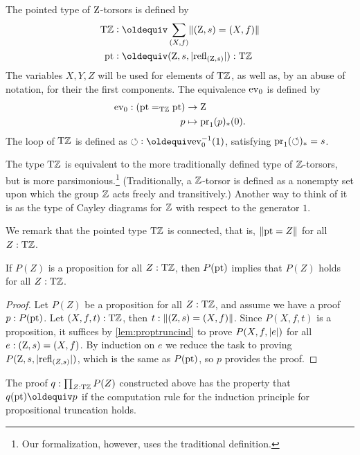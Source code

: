 \documentclass[a4paper,12pt]{amsart}
\begin{document}
\begin{definition}\label{def:TorZ}
  The pointed type of $\mathrm{Z}$-torsors is defined by
  \begin{align*}
    \TorZ &\defeq \sum_{(X,f)}\Trunc{(\zet,s)=(X,f)}  \\
    \pt & \defeq (\zet,s,\trunc{\refl{(\zet,s)}}) : \TorZ
  \end{align*}
  The variables $X,Y,Z$ will be used for elements of ${\mathrm{T}\mathbb{Z}}$,
  as well as, by an abuse of notation, for their the first components.
  The equivalence $\mathrm{ev}_0$ is defined by
  \begin{align*}
    \mathrm{ev}_0: ({\mathord{\mathrm{pt}}} =_{\mathrm{T}\mathbb{Z}} {\mathord{\mathrm{pt}}}) & \to\mathrm{Z} \\
    p & \mapsto \operatorname{pr}_1(p)_*(0).
  \end{align*}
  The loop of ${\mathrm{T}\mathbb{Z}}$ is defined as ${\Zloop}\defeq\ev_0^{-1}(1)$,
  satisfying $\operatorname{pr}_1({\circlearrowleft})_* = s$.
\end{definition}

The type ${\mathrm{T}\mathbb{Z}}$ is equivalent to the more traditionally defined
type of $\mathbb{Z}$-torsors, but is more parsimonious.\footnote{Our formalization, however, uses the traditional definition.}
(Traditionally, a $\mathbb{Z}$-torsor is defined as a nonempty set upon which the group $\mathbb{Z}$ acts freely and transitively.)
Another way to think of it is as the type of Cayley diagrams for $\mathbb{Z}$
with respect to the generator $1$.

We remark that the pointed type ${\mathrm{T}\mathbb{Z}}$ is connected, that is, $\lVert{\mathord{\mathrm{pt}}}=Z\rVert$ for all $Z:{\mathrm{T}\mathbb{Z}}$.


\begin{lemma}\label{lem:dep-elim-TorZ}
If $P(Z)$ is a proposition for all $Z:{\mathrm{T}\mathbb{Z}}$, then $P({\mathord{\mathrm{pt}}})$ implies that $P(Z)$ holds for all $Z:{\mathrm{T}\mathbb{Z}}$.
\end{lemma}

\begin{proof}
Let $P(Z)$ be a proposition for all $Z:{\mathrm{T}\mathbb{Z}}$, and assume we have a proof
$p:P({\mathord{\mathrm{pt}}})$. Let $(X,f,t):{\mathrm{T}\mathbb{Z}}$, then $t :\lVert(\mathrm{Z},s)=(X,f)\rVert$.
Since $P(X,f,t)$ is a proposition, it suffices by \cref{lem:proptruncind}
to prove $P(X,f,\lvert e\rvert)$ for all $e:(\mathrm{Z},s)=(X,f)$.
By induction on $e$ we reduce the task to proving $P(\mathrm{Z},s,\lvert\mathop{{\mathrm{refl}}_{(Z,s)}}\rvert)$, which is
the same as $P({\mathord{\mathrm{pt}}})$, so $p$ provides the proof.
\end{proof}

The proof $q: \prod_{Z:{\mathrm{T}\mathbb{Z}}} P(Z)$ constructed above has the property that $q(\pt)\jdeq p$ if the computation rule for the induction principle
for propositional truncation holds.
\end{document}
